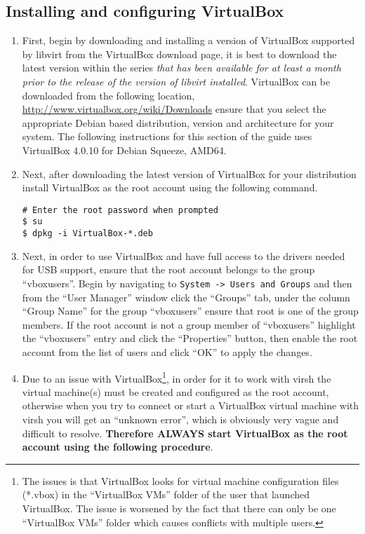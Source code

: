 \subsection{Installing and configuring VirtualBox}
\label{sec:debianvbox}
\begin{enumerate}
\item	First, begin by downloading and installing a version of VirtualBox supported by libvirt from the VirtualBox download 
		page, it is best to download the latest version within the series \emph{that has been available for at least a month 
		prior to the release of the version of libvirt installed}. VirtualBox can be downloaded from the following location,  
		\url{http://www.virtualbox.org/wiki/Downloads} ensure that you select the appropriate Debian based distribution, 
		version and architecture for your system. The following instructions for this section of the guide uses VirtualBox 
		4.0.10 for Debian Squeeze, AMD64.
		 	
\item	Next, after downloading the latest version of VirtualBox for your distribution install VirtualBox as the root
		account using the following command.
\begin{lstlisting}
# Enter the root password when prompted
$ su
$ dpkg -i VirtualBox-*.deb
\end{lstlisting}	

\item	Next, in order to use VirtualBox and have full access to the drivers needed for USB support, ensure that the root
		account belongs to the group ``vboxusers''. Begin by navigating to \verb|System -> Users and Groups| and then from
		the ``User Manager'' window click the ``Groups'' tab, under the column ``Group Name'' for the group ``vboxusers'' 
		ensure that root is one of the group members. If the root account is not a group member of ``vboxusers'' highlight
		the ``vboxusers'' entry and click the ``Properties'' button, then enable the root account from the list of users
		and click ``OK'' to apply the changes.
		
\item	Due to an issue with VirtualBox\footnote{The issues is that VirtualBox looks for virtual machine configuration files (*.vbox)
		in the ``VirtualBox VMs'' folder of the user that launched VirtualBox. The issue is worsened by the fact that there can
		only be one ``VirtualBox VMs'' folder which causes conflicts with multiple users.}, in order for it to work with virsh 
		the virtual machine(s) must be created and configured as the root account, otherwise when you try to connect or start a 
		VirtualBox virtual machine with virsh you will get an ``unknown error'', which is obviously very vague and difficult to 
		resolve. {\bf Therefore ALWAYS start VirtualBox as the root account using the following procedure}.


\end{enumerate}
